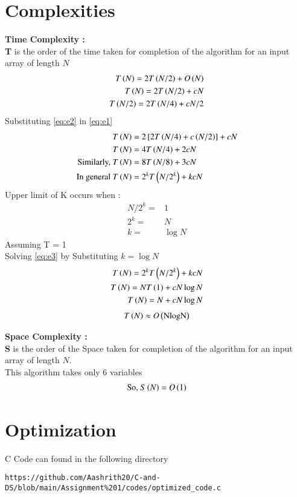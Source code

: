 \documentclass[journal,12pt,twocolumn]{IEEEtran}
\begin{document}
\section{Complexities}
\textbf{Time Complexity : }\\
\textbf{T} is the order of the time taken for completion of the algorithm for an input array of length $N$
\begin{align}
    T\brak{N} = 2T\brak{N/2} + O\brak{N} \\
    \label{eq:e1}
    T\brak{N} = 2T\brak{N/2} + cN \\
    \label{eq:e2}
    T\brak{N/2} = 2T\brak{N/4} + cN/2
\end{align}
Substituting \eqref{eq:e2} in \eqref{eq:e1}
\begin{align}
    T\brak{N} &= 2\sbrak{2T\brak{N/4}+c\brak{N/2}} + cN \\
    T\brak{N} &= 4T\brak{N/4} + 2cN \\
    \text{Similarly, }T\brak{N} &= 8T\brak{N/8} + 3cN \\
    \text{In general }T\brak{N}&=2^k T\brak{N/2^k} + kcN 
    \label{eq:e3}
\end{align}
Upper limit of K occurs when :
\begin{align}
    N/2^k =& 1\\
    2^k =& N \\
    k =& \log{N}
\end{align}
Assuming T = 1 \\
Solving \eqref{eq:e3} by Substituting $k =\log{N}$ \\
\begin{align}
    T\left(N\right)=2^k T\left(N/2^k\right) + kcN\\
    T\left(N\right)=N T\left(1\right) + cN\log{N} \\
    T\left(N\right)=N+cN\log{N}
\end{align}
\begin{align}
    T\left(N\right) \approx O\left(\text{NlogN}\right)
\end{align}

\textbf{Space Complexity : }\\
\textbf{S} is the order of the Space taken for completion of the algorithm for an input array of length $N$.\\
This algorithm takes only 6 variables 
\begin{align}
    \text{So, }S\left(N\right) = O\left(1\right)
\end{align}
\section{Optimization}
C Code can found in the following directory
\begin{lstlisting}
https://github.com/Aashrith20/C-and-DS/blob/main/Assignment%201/codes/optimized_code.c
\end{lstlisting}
\end{document}

